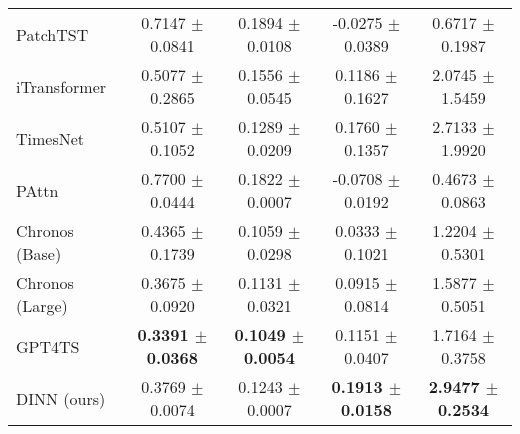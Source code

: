 {\begin{tabular}{lcccc}
PatchTST                             & 0.7147 $\pm$ 0.0841           & 0.1894 $\pm$ 0.0108           & -0.0275 $\pm$ 0.0389         & 0.6717 $\pm$ 0.1987            \\
iTransformer                         & 0.5077 $\pm$ 0.2865           & 0.1556 $\pm$ 0.0545           & 0.1186 $\pm$ 0.1627          & 2.0745 $\pm$ 1.5459            \\
TimesNet                             & 0.5107 $\pm$ 0.1052           & 0.1289 $\pm$ 0.0209           & 0.1760 $\pm$ 0.1357          & 2.7133 $\pm$ 1.9920            \\
PAttn                                & 0.7700 $\pm$ 0.0444           & 0.1822 $\pm$ \color[HTML]{00009B} 0.0007           & -0.0708 $\pm$ 0.0192         & 0.4673 $\pm$ \color[HTML]{00009B} 0.0863            \\
Chronos (Base)                       & 0.4365 $\pm$ 0.1739           & 0.1059 $\pm$ 0.0298           & 0.0333 $\pm$ 0.1021          & 1.2204 $\pm$ 0.5301            \\
Chronos (Large)                      & 0.3675 $\pm$ 0.0920           & 0.1131 $\pm$ 0.0321           & 0.0915 $\pm$ 0.0814          & 1.5877 $\pm$ 0.5051            \\
GPT4TS                               & \textbf{0.3391 $\pm$ 0.0368}  & \textbf{0.1049 $\pm$ 0.0054}  & 0.1151 $\pm$ 0.0407          & 1.7164 $\pm$ 0.3758            \\
DINN (ours)                          & 0.3769 $\pm$ \color[HTML]{00009B} 0.0074           & 0.1243 $\pm$ \color[HTML]{00009B} 0.0007           & \textbf{0.1913 $\pm$ \color[HTML]{00009B} 0.0158} & \textbf{2.9477 $\pm$ 0.2534}   \\ \hline
\end{tabular}}